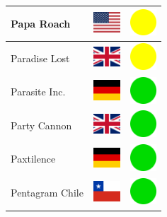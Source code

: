\documentclass[12pt, a4paper, twoside]{report}
\begin{document}
\begin{center}
\begin{longtable}{|p{5cm}|p{2cm}|p{2cm}|}
 Papa Roach                                                 & \includegraphics[width=1cm]{../4x3/us} &   \includegraphics[width=1cm]{../likes/m} \\ \hline
 Paradise Lost                                              & \includegraphics[width=1cm]{../4x3/gb} &   \includegraphics[width=1cm]{../likes/m} \\ \hline
 Parasite Inc.                                              & \includegraphics[width=1cm]{../4x3/de} &   \includegraphics[width=1cm]{../likes/y} \\ \hline
 Party Cannon                                               & \includegraphics[width=1cm]{../4x3/gb} &   \includegraphics[width=1cm]{../likes/y} \\ \hline
 Paxtilence                                                 & \includegraphics[width=1cm]{../4x3/de} &   \includegraphics[width=1cm]{../likes/y} \\ \hline
 Pentagram Chile                                            & \includegraphics[width=1cm]{../4x3/cl} &   \includegraphics[width=1cm]{../likes/y} \\ \hline

\end{longtable}
\end{center}
\end{document}
